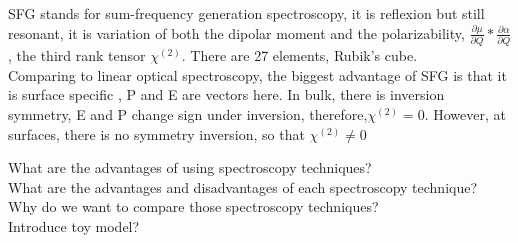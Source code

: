 SFG stands for sum-frequency generation spectroscopy, it is reflexion but still resonant, it is variation of both the dipolar moment and the polarizability, $\frac{\partial\mu}{\partial Q} *  \frac{\partial\alpha}{\partial Q} $, the third rank tensor $ \chi^{(2)}$. There are 27 elements, Rubik's cube. \\

Comparing to linear optical spectroscopy, the biggest advantage of SFG is that it is surface specific $ $, P and E are vectors here. In bulk, there is inversion symmetry, E and P change sign under inversion, therefore,$
\chi^{(2)} = 0$. However, at surfaces, there is no symmetry inversion, so that $\chi^{(2)} \neq 0 $
	
	
	
	What are the advantages of using spectroscopy techniques? \\
	What are the advantages and disadvantages of each spectroscopy technique? \\
	Why do we want to compare those spectroscopy techniques? \\
	Introduce toy model?



